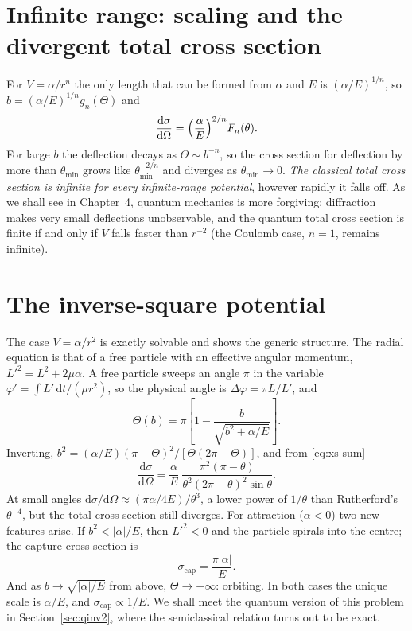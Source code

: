 \documentclass[11pt,a4paper]{book}
\numberwithin{equation}{chapter}
\newcommand{\dd}{\mathrm{d}}
\newcommand{\dsdO}{\frac{\dd\sigma}{\dd\Omega}}
\begin{document}
\section{Infinite range: scaling and the divergent total cross section}
\label{sec:scaling}

For $V=\alpha/r^n$ the only length that can be formed from $\alpha$ and $E$ is
$(\alpha/E)^{1/n}$, so $b=(\alpha/E)^{1/n}g_n(\Theta)$ and
\begin{equation}\label{eq:scaling}
  \dsdO=\Bigl(\frac\alpha E\Bigr)^{2/n}F_n(\theta).
\end{equation}
For large $b$ the deflection decays as $\Theta\sim b^{-n}$, so the cross section
for deflection by more than $\theta_{\min}$ grows like
$\theta_{\min}^{-2/n}$ and diverges as $\theta_{\min}\to0$.
\emph{The classical total cross section is infinite for every infinite-range
potential}, however rapidly it falls off. As we shall see in Chapter~4, quantum
mechanics is more forgiving: diffraction makes very small deflections
unobservable, and the quantum total cross section is finite if and only if $V$
falls faster than $r^{-2}$ (the Coulomb case, $n=1$, remains infinite).

\section{The inverse-square potential}\label{sec:classinv2}

The case $V=\alpha/r^2$ is exactly solvable and shows the generic structure.
The radial equation is that of a free particle with an effective angular
momentum, $L'^2=L^2+2\mu\alpha$. A free particle sweeps an angle $\pi$ in the
variable $\varphi'=\int L'\,\dd t/(\mu r^2)$, so the physical angle is
$\Delta\varphi=\pi L/L'$, and
\begin{equation}\label{eq:Theta2}
  \Theta(b)=\pi\left[1-\frac{b}{\sqrt{b^2+\alpha/E}}\right].
\end{equation}
Inverting,
$b^2=(\alpha/E)(\pi-\Theta)^2/[\Theta(2\pi-\Theta)]$, and from
\eqref{eq:xs-sum}
\begin{equation}\label{eq:xs2}
  \dsdO=\frac{\alpha}{E}\;
   \frac{\pi^2(\pi-\theta)}{\theta^2(2\pi-\theta)^2\sin\theta}.
\end{equation}
At small angles $\dd\sigma/\dd\Omega\approx(\pi\alpha/4E)/\theta^3$, a lower
power of $1/\theta$ than Rutherford's $\theta^{-4}$, but the total cross
section still diverges. For attraction ($\alpha<0$) two new features arise. If
$b^2<|\alpha|/E$, then $L'^2<0$ and the particle spirals into the centre; the
capture cross section is
\begin{equation}\label{eq:cap2}
  \sigma_{\mathrm{cap}}=\frac{\pi|\alpha|}{E}.
\end{equation}
And as $b\to\sqrt{|\alpha|/E}$ from above, $\Theta\to-\infty$: orbiting. In both
cases the unique scale is $\alpha/E$, and $\sigma_{\mathrm{cap}}\propto1/E$. We
shall meet the quantum version of this problem in Section~\ref{sec:qinv2},
where the semiclassical relation turns out to be exact.
\end{document}
